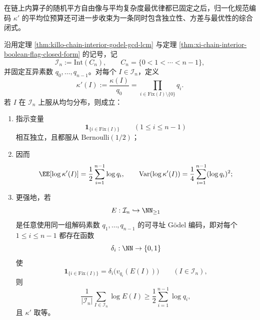 在链上内算子的随机平方自由像与平均复杂度最优律都已固定之后，归一化规范编码 \(\kappa'\) 的平均位预算还可进一步收束为一条同时包含独立性、方差与最优性的综合闭式。

\begin{theorem}\label{thm:xi-time-part61acc-chain-godel-average-variance-budget-optimality}
沿用定理 \ref{thm:killo-chain-interior-godel-gcd-lcm} 与定理 \ref{thm:xi-chain-interior-boolean-flag-closed-form} 的记号，记
\[
\mathcal I_n:=\mathrm{Int}(C_n),
\qquad
C_n=\{0<1<\cdots<n-1\},
\]
并固定互异素数 \(q_0,\dots,q_{n-1}\)。对每个 \(I\in\mathcal I_n\)，定义
\[
\kappa'(I):=\frac{\kappa(I)}{q_0}
=
\prod_{i\in \mathrm{Fix}(I)\setminus\{0\}}q_i.
\]
若 \(I\) 在 \(\mathcal I_n\) 上服从均匀分布，则成立：
\begin{enumerate}
  \item 指示变量
        \[
        \mathbf 1_{\{i\in \mathrm{Fix}(I)\}}
        \qquad (1\le i\le n-1)
        \]
        相互独立，且都服从 \(\mathrm{Bernoulli}(1/2)\)；
  \item 因而
        \[
        \EE[\log \kappa'(I)]
        =
        \frac12\sum_{i=1}^{n-1}\log q_i,
        \qquad
        \mathrm{Var}(\log \kappa'(I))
        =
        \frac14\sum_{i=1}^{n-1}(\log q_i)^2;
        \]
  \item 更强地，若
        \[
        E:\mathcal I_n\hookrightarrow \NN_{\ge 1}
        \]
        是任意使用同一组解码素数 \(q_1,\dots,q_{n-1}\) 的可寻址 Gödel 编码，即对每个 \(1\le i\le n-1\) 都存在函数
        \[
        \delta_i:\NN\to\{0,1\}
        \]
        使
        \[
        \mathbf 1_{\{i\in \mathrm{Fix}(I)\}}
        =
        \delta_i\!\bigl(v_{q_i}(E(I))\bigr)
        \qquad (I\in\mathcal I_n),
        \]
        则
        \[
        \frac{1}{|\mathcal I_n|}
        \sum_{I\in\mathcal I_n}\log E(I)
        \ge
        \frac12\sum_{i=1}^{n-1}\log q_i,
        \]
        且 \(\kappa'\) 取等。
\end{enumerate}
\end{theorem}
